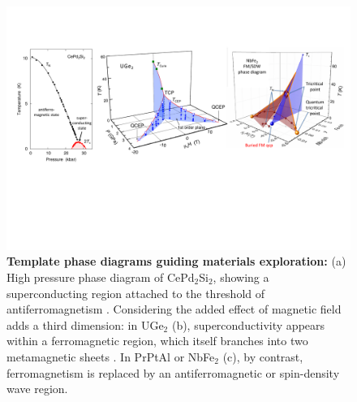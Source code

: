 \begin{figure}
  \includegraphics[width=1.9\columnwidth]{Figures/PhaseDias.pdf}
  \caption{{\bf Template phase diagrams guiding materials exploration:}  (a) High pressure phase diagram of CePd$_2$Si$_2$, showing a superconducting region attached to the 
  threshold of antiferromagnetism \protect{}. Considering the added effect of magnetic field adds a third dimension:
  in UGe$_2$ (b), 
  superconductivity appears within a ferromagnetic region, which itself branches into two metamagnetic sheets \protect\cite{kotegawa11}. In PrPtAl or NbFe$_2$ \protect{} (c), by contrast, ferromagnetism is replaced by an antiferromagnetic or spin-density wave region.
}
  \label{fig:Guiding}
  
\end{figure}
  
  






